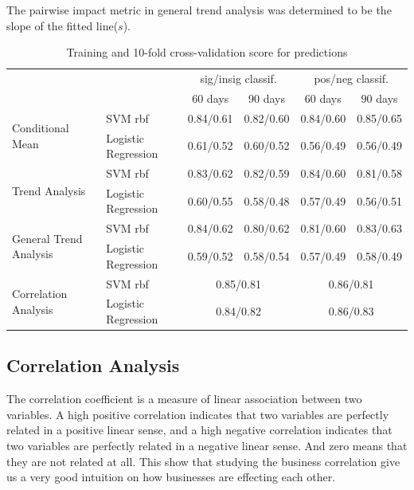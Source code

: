 \documentclass{vldb}
\begin{document}
The pairwise impact metric in general trend analysis was determined to be the slope of the fitted line($s$). 

\begin{table}[ht!]
\centering
\begin{tabular}{@{}llrrrr@{}}
\toprule
                                                              &                     & \multicolumn{2}{c}{sig/insig classif.} & \multicolumn{2}{c}{pos/neg classif.} \\ 
\cmidrule(r){3-4}
\cmidrule(r){5-6}
                                                              &                     & \multicolumn{1}{c}{60 days} & \multicolumn{1}{c}{90 days} & \multicolumn{1}{c}{60 days} & \multicolumn{1}{c}{90 days} \\ \midrule
\multirow{2}{*}{Conditional Mean}  & SVM rbf             &   0.84/0.61   &  0.82/0.60  & 0.84/0.60 &  0.85/0.65  \\
                                        & Logistic Regression & 0.61/0.52  & 0.60/0.52 &  0.56/0.49   &  0.56/0.49   \\ \midrule
\multirow{2}{*}{Trend Analysis}       & SVM rbf             & 0.83/0.62    &  0.82/0.59 & 0.84/0.60 & 0.81/0.58   \\
                                        & Logistic Regression &  0.60/0.55   & 0.58/0.48 &  0.57/0.49  &  0.56/0.51   \\ \midrule
\multirow{2}{*}{General Trend Analysis} & SVM rbf             & 0.84/0.62 & 0.80/0.62 &  0.81/0.60 &  0.83/0.63  \\
                                       & Logistic Regression &  0.59/0.52  & 0.58/0.54  &   0.57/0.49  &   0.58/0.49       \\ \midrule
\multirow{2}{*}{Correlation Analysis}   & SVM rbf             & \multicolumn{2}{c}{0.85/0.81}  & \multicolumn{2}{c}{0.86/0.81} \\
                                        & Logistic Regression & \multicolumn{2}{c}{0.84/0.82}  & \multicolumn{2}{c}{0.86/0.83} \\
\bottomrule
\end{tabular}
\caption{Training and 10-fold cross-validation score for predictions}
\label{tab:results}
\end{table}

\subsection*{Correlation Analysis}
The correlation coefficient is a measure of linear association between two variables. A high positive correlation indicates that two variables are perfectly related in a positive linear sense, and a high negative correlation indicates that two variables are perfectly related in a negative linear sense. And zero means that they are not related at all. This show that studying the business correlation give us a very good intuition on how businesses are effecting each other. 
\end{document}
